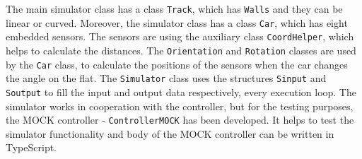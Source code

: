 The main simulator class has a class \texttt{Track}, which has \texttt{Walls} and they can be linear or curved. Moreover, the simulator class has a class \texttt{Car}, which has eight embedded sensors. The sensors are using the auxiliary class \texttt{CoordHelper}, which helps to calculate the distances. The \texttt{Orientation} and \texttt{Rotation} classes are used by the \texttt{Car} class, to calculate the positions of the sensors when the car changes the angle on the flat. The \texttt{Simulator} class uses the structures \texttt{Sinput} and \texttt{Soutput} to fill the input and output data respectively, every execution loop. The simulator works in cooperation with the controller, but for the testing purposes, the MOCK \cite{doglio2018testing} controller - \texttt{ControllerMOCK} has been developed. It helps to test the simulator functionality and body of the MOCK controller can be written in TypeScript.

